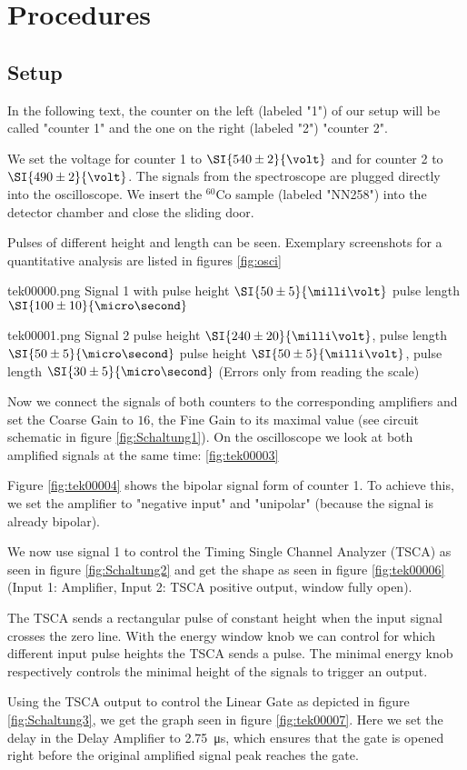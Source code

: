 \section{Procedures}
%
\subsection{Setup}
%
In the following text, the counter on the left (labeled "1") of our setup will be called "counter 1" and the one on the right (labeled "2") "counter 2".
%
\par
%
We set the voltage for counter 1 to $\SI{540 \pm 2}{\volt}$ and for counter 2 to $\SI{490 \pm 2}{\volt}$.
The signals from the spectroscope are plugged directly into the oscilloscope.
We insert the $^{60}\text{Co}$ sample (labeled "NN258") into the detector chamber and close the sliding door.
%
\par
%
Pulses of different height and length can be seen.
Exemplary screenshots for a quantitative analysis are listed in figures \ref{fig:osci}
%
\par
%
tek00000.png
Signal 1
with pulse height $\SI{50 \pm 5}{\milli\volt}$
pulse length $\SI{100 \pm 10}{\micro\second}$
%
\par
%
tek00001.png
Signal 2
pulse height $\SI{240 \pm 20}{\milli\volt}$, pulse length $\SI{50 \pm 5}{\micro\second}$
pulse height $\SI{50 \pm 5}{\milli\volt}$, pulse length $\SI{30 \pm 5}{\micro\second}$
(Errors only from reading the scale)
%
\par
%
Now we connect the signals of both counters to the corresponding amplifiers and set the Coarse Gain to $16$, the Fine Gain to its maximal value (see circuit schematic in figure \ref{fig:Schaltung1}).
On the oscilloscope we look at both amplified signals at the same time:
\ref{fig:tek00003}
%
\par
%
Figure \ref{fig:tek00004} shows the bipolar signal form of counter 1.
To achieve this, we set the amplifier to "negative input" and "unipolar" (because the signal is already bipolar).
%
\par
%
We now use signal 1 to control the Timing Single Channel Analyzer (TSCA) as seen in figure \ref{fig:Schaltung2} and get the shape as seen in figure \ref{fig:tek00006} (Input 1: Amplifier, Input 2: TSCA positive output, window fully open).
%
\par
%
The TSCA sends a rectangular pulse of constant height when the input signal crosses the zero line.
With the energy window knob we can control for which different input pulse heights the TSCA sends a pulse.
The minimal energy knob respectively controls the minimal height of the signals to trigger an output.
%
\par
%
Using the TSCA output to control the Linear Gate as depicted in figure \ref{fig:Schaltung3}, we get the graph seen in figure \ref{fig:tek00007}.
Here we set the delay in the Delay Amplifier to \SI{2.75}{\micro\second}, which ensures that the gate is opened right before the original amplified signal peak reaches the gate.
%
